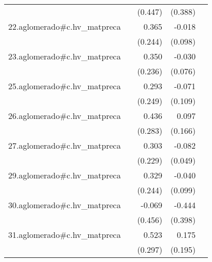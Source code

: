 {\begin{longtable}{l*{4}{D{.}{.}{-1}}}
            &                     &     (0.447)         &     (0.388)         &                     \\
\addlinespace
22.aglomerado#c.hv\_matpreca&                     &       0.365         &      -0.018         &                     \\
            &                     &     (0.244)         &     (0.098)         &                     \\
\addlinespace
23.aglomerado#c.hv\_matpreca&                     &       0.350         &      -0.030         &                     \\
            &                     &     (0.236)         &     (0.076)         &                     \\
\addlinespace
25.aglomerado#c.hv\_matpreca&                     &       0.293         &      -0.071         &                     \\
            &                     &     (0.249)         &     (0.109)         &                     \\
\addlinespace
26.aglomerado#c.hv\_matpreca&                     &       0.436         &       0.097         &                     \\
            &                     &     (0.283)         &     (0.166)         &                     \\
\addlinespace
27.aglomerado#c.hv\_matpreca&                     &       0.303         &      -0.082         &                     \\
            &                     &     (0.229)         &     (0.049)         &                     \\
\addlinespace
29.aglomerado#c.hv\_matpreca&                     &       0.329         &      -0.040         &                     \\
            &                     &     (0.244)         &     (0.099)         &                     \\
\addlinespace
30.aglomerado#c.hv\_matpreca&                     &      -0.069         &      -0.444         &                     \\
            &                     &     (0.456)         &     (0.398)         &                     \\
\addlinespace
31.aglomerado#c.hv\_matpreca&                     &       0.523         &       0.175         &                     \\
            &                     &     (0.297)         &     (0.195)         &                     \\

\end{longtable}}

